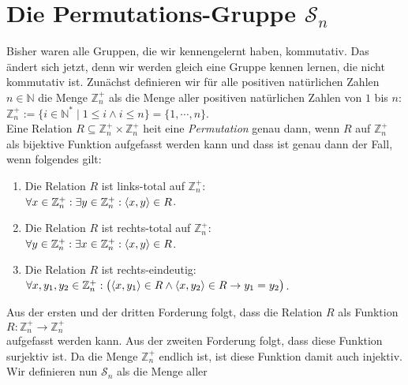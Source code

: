 \section{Die Permutations-Gruppe $\mathcal{S}_n$}
Bisher waren alle Gruppen, die wir kennengelernt haben, kommutativ.  Das \"{a}ndert sich jetzt, denn wir
werden gleich eine Gruppe kennen lernen, die nicht kommutativ ist.  Zun\"{a}chst definieren wir f\"{u}r alle
positiven nat\"{u}rlichen Zahlen $n \in \mathbb{N}$ die Menge $\mathbb{Z}_n^+$ als die Menge aller positiven nat\"{u}rlichen Zahlen
von $1$ bis $n$:
\\[0.2cm]
\hspace*{1.3cm}
$\mathbb{Z}_n^+ := \{ i \in \mathbb{N}^* \mid 1 \leq i \wedge i \leq n \} = \{ 1, \cdots, n\}$.
\\[0.2cm]
Eine Relation $R \subseteq \mathbb{Z}_n^+ \times \mathbb{Z}_n^+$ hei\3t eine \emph{\color{blue}Permutation} genau dann, wenn $R$ auf $\mathbb{Z}_n^+$
als bijektive Funktion aufgefasst werden kann und dass ist genau dann der Fall, wenn folgendes gilt:
\begin{enumerate}
\item Die Relation $R$ ist links-total auf $\mathbb{Z}_n^+$:
      \\[0.2cm]
      \hspace*{1.3cm}
      $\forall x \in \mathbb{Z}_n^+: \exists y \in \mathbb{Z}_n^+: \pair(x,y) \in R$.
\item Die Relation $R$ ist rechts-total auf $\mathbb{Z}_n^+$:
      \\[0.2cm]
      \hspace*{1.3cm}
      $\forall y \in \mathbb{Z}_n^+: \exists x \in \mathbb{Z}_n^+: \pair(x,y) \in R$.
\item Die Relation $R$ ist rechts-eindeutig:
      \\[0.2cm]
      \hspace*{1.3cm}
      $\forall x, y_1, y_2 \in \mathbb{Z}_n^+:\bigl(\pair(x,y_1) \in R \wedge \pair(x,y_2) \in R \rightarrow y_1 = y_2\bigr)$.
\end{enumerate}
Aus der ersten und der dritten Forderung folgt, dass die Relation $R$ als Funktion
\\[0.2cm]
\hspace*{1.3cm} $R : \mathbb{Z}_n^+ \rightarrow \mathbb{Z}_n^+$
\\[0.2cm]
aufgefasst werden kann.  Aus der zweiten Forderung folgt, dass diese Funktion surjektiv ist.  Da die
Menge $\mathbb{Z}_n^+$ endlich ist, ist diese Funktion damit auch injektiv.
Wir definieren nun $\mathcal{S}_n$ als die Menge aller
